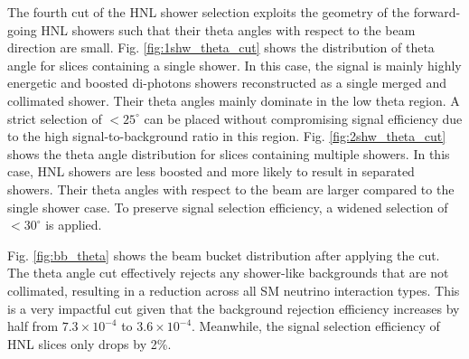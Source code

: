 The fourth cut of the HNL shower selection exploits the geometry of the forward-going HNL showers such that their theta angles with respect to the beam direction are small.                                      
Fig. \ref{fig:1shw_theta_cut} shows the distribution of theta angle for slices containing a single shower.                                                                                                   
In this case, the signal is mainly highly energetic and boosted di-photons showers reconstructed as a single merged and collimated shower.
Their theta angles mainly dominate in the low theta region.
A strict selection of $< 25^{\circ}$ can be placed without compromising signal efficiency due to the high signal-to-background ratio in this region.
Fig. \ref{fig:2shw_theta_cut} shows the theta angle distribution for slices containing multiple showers.
In this case, HNL showers are less boosted and more likely to result in separated showers.
Their theta angles with respect to the beam are larger compared to the single shower case.
To preserve signal selection efficiency, a widened selection of $< 30^{\circ}$ is applied.

Fig. \ref{fig:bb_theta} shows the beam bucket distribution after applying the cut.
The theta angle cut effectively rejects any shower-like backgrounds that are not collimated, resulting in a reduction across all SM neutrino interaction types.
This is a very impactful cut given that the background rejection efficiency increases by half from $7.3 \times 10^{-4}$ to $3.6 \times 10^{-4}$.
Meanwhile, the signal selection efficiency of HNL slices only drops by 2\%.

